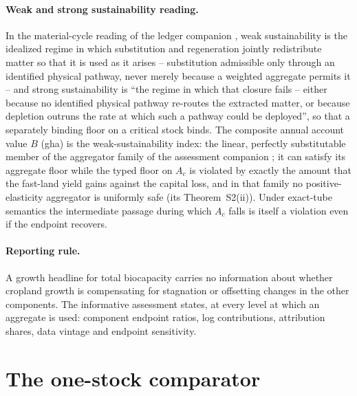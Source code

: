 \paragraph{Weak and strong sustainability reading.} In the material-cycle reading of the ledger companion \citep{Abaee2026c}, weak sustainability is the idealized regime in which substitution and regeneration jointly redistribute matter so that it is used as it arises -- substitution admissible only through an identified physical pathway, never merely because a weighted aggregate permits it -- and strong sustainability is ``the regime in which that closure fails -- either because no identified physical pathway re-routes the extracted matter, or because depletion outruns the rate at which such a pathway could be deployed'', so that a separately binding floor on a critical stock binds. The composite annual account value $B$ (gha) is the weak-sustainability index: the linear, perfectly substitutable member of the aggregator family of the assessment companion \citep[Lemma~A of][]{Abaee2026b}; it can satisfy its aggregate floor while the typed floor on $A_c$ is violated by exactly the amount that the fast-land yield gains against the capital loss, and in that family no positive-elasticity aggregator is uniformly safe (its Theorem~S2(ii)). Under exact-tube semantics the intermediate passage during which $A_c$ falls is itself a violation even if the endpoint recovers.

\paragraph{Reporting rule.} A growth headline for total biocapacity carries no information about whether cropland growth is compensating for stagnation or offsetting changes in the other components. The informative assessment states, at every level at which an aggregate is used: component endpoint ratios, log contributions, attribution shares, data vintage and endpoint sensitivity.

\section{The one-stock comparator}\label{si:onestock}

